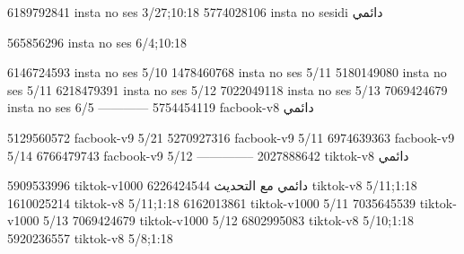 
6189792841 insta no ses
3/27;10:18
5774028106 insta no sesidi
دائمي


565856296 insta no ses
6/4;10:18


6146724593 insta no ses
5/10
1478460768 insta no ses
5/11
5180149080 insta no ses
5/11
6218479391 insta no ses
5/12
7022049118 insta no ses
5/13
7069424679 insta no ses
6/5
------------
5754454119 facbook-v8
دائمي

5129560572 facbook-v9
5/21
5270927316 facbook-v9
5/11
6974639363 facbook-v9
5/14
6766479743 facbook-v9
5/12
--------------
2027888642 tiktok-v8
دائمي

5909533996 tiktok-v1000
دائمي مع التحديث
6226424544 tiktok-v8
5/11;1:18
1610025214 tiktok-v8
5/11;1:18
6162013861 tiktok-v1000
5/11
7035645539 tiktok-v1000
5/13
7069424679 tiktok-v1000
5/12
6802995083 tiktok-v8
5/10;1:18
5920236557 tiktok-v8
5/8;1:18
